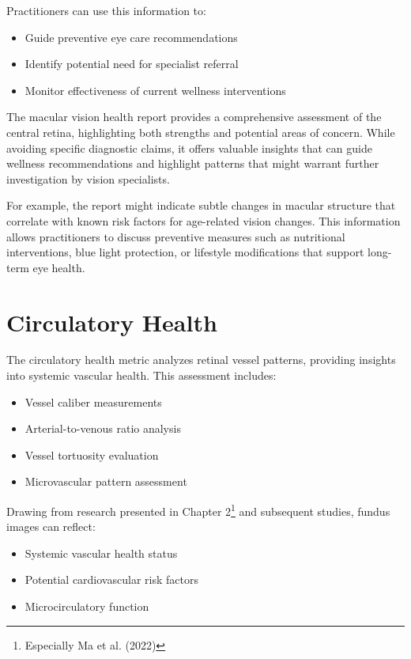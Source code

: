 \documentclass[
  Letterpaper,
]{scrbook}
\providecommand{\tightlist}{%
  \setlength{\itemsep}{0pt}\setlength{\parskip}{0pt}}\usepackage{longtable,booktabs,array}
\begin{document}
Practitioners can use this information to:

\begin{itemize}
\tightlist
\item
  Guide preventive eye care recommendations
\item
  Identify potential need for specialist referral
\item
  Monitor effectiveness of current wellness interventions
\end{itemize}

The macular vision health report provides a comprehensive assessment of
the central retina, highlighting both strengths and potential areas of
concern. While avoiding specific diagnostic claims, it offers valuable
insights that can guide wellness recommendations and highlight patterns
that might warrant further investigation by vision specialists.

For example, the report might indicate subtle changes in macular
structure that correlate with known risk factors for age-related vision
changes. This information allows practitioners to discuss preventive
measures such as nutritional interventions, blue light protection, or
lifestyle modifications that support long-term eye health.

\section{Circulatory Health}\label{circulatory-health}

The circulatory health metric analyzes retinal vessel patterns,
providing insights into systemic vascular health. This assessment
includes:

\begin{itemize}
\tightlist
\item
  Vessel caliber measurements
\item
  Arterial-to-venous ratio analysis
\item
  Vessel tortuosity evaluation
\item
  Microvascular pattern assessment
\end{itemize}

Drawing from research presented in Chapter 2\footnote{Especially Ma et
  al. (2022)} and subsequent studies, fundus images can reflect:

\begin{itemize}
\tightlist
\item
  Systemic vascular health status
\item
  Potential cardiovascular risk factors
\item
  Microcirculatory function
\end{itemize}
\end{document}
